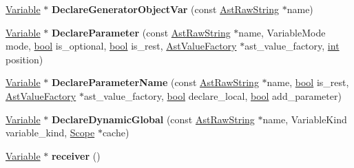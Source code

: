 \begin{DoxyCompactItemize}
\item 
\mbox{\label{classv8_1_1internal_1_1DeclarationScope_a5540fce2f69add914731ee02d316bb0c}} 
\mbox{\hyperlink{classv8_1_1internal_1_1Variable}{Variable}} $\ast$ {\bfseries Declare\+Generator\+Object\+Var} (const \mbox{\hyperlink{classv8_1_1internal_1_1AstRawString}{Ast\+Raw\+String}} $\ast$name)
\item 
\mbox{\label{classv8_1_1internal_1_1DeclarationScope_adeb49d2ec5cd6b3f3909d5f4c0481d4c}} 
\mbox{\hyperlink{classv8_1_1internal_1_1Variable}{Variable}} $\ast$ {\bfseries Declare\+Parameter} (const \mbox{\hyperlink{classv8_1_1internal_1_1AstRawString}{Ast\+Raw\+String}} $\ast$name, Variable\+Mode mode, \mbox{\hyperlink{classbool}{bool}} is\+\_\+optional, \mbox{\hyperlink{classbool}{bool}} is\+\_\+rest, \mbox{\hyperlink{classv8_1_1internal_1_1AstValueFactory}{Ast\+Value\+Factory}} $\ast$ast\+\_\+value\+\_\+factory, \mbox{\hyperlink{classint}{int}} position)
\item 
\mbox{\label{classv8_1_1internal_1_1DeclarationScope_a72e4f490e86b31d77f26ac6ad8ca6937}} 
\mbox{\hyperlink{classv8_1_1internal_1_1Variable}{Variable}} $\ast$ {\bfseries Declare\+Parameter\+Name} (const \mbox{\hyperlink{classv8_1_1internal_1_1AstRawString}{Ast\+Raw\+String}} $\ast$name, \mbox{\hyperlink{classbool}{bool}} is\+\_\+rest, \mbox{\hyperlink{classv8_1_1internal_1_1AstValueFactory}{Ast\+Value\+Factory}} $\ast$ast\+\_\+value\+\_\+factory, \mbox{\hyperlink{classbool}{bool}} declare\+\_\+local, \mbox{\hyperlink{classbool}{bool}} add\+\_\+parameter)
\item 
\mbox{\label{classv8_1_1internal_1_1DeclarationScope_afe690120167bcf70a2dc9878b75b024c}} 
\mbox{\hyperlink{classv8_1_1internal_1_1Variable}{Variable}} $\ast$ {\bfseries Declare\+Dynamic\+Global} (const \mbox{\hyperlink{classv8_1_1internal_1_1AstRawString}{Ast\+Raw\+String}} $\ast$name, Variable\+Kind variable\+\_\+kind, \mbox{\hyperlink{classv8_1_1internal_1_1Scope}{Scope}} $\ast$cache)
\item 
\mbox{\label{classv8_1_1internal_1_1DeclarationScope_a0bfa2719c702356a09d0a76312b5c772}} 
\mbox{\hyperlink{classv8_1_1internal_1_1Variable}{Variable}} $\ast$ {\bfseries receiver} ()

\end{DoxyCompactItemize}
